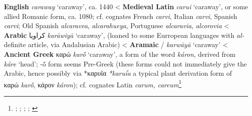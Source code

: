 \begin{etymology}\label{ety:caraway}
\textbf{English} \textit{caraway} `caraway', ca. 1440
< \textbf{Medieval Latin} \textit{carui} `caraway', or some allied Romanic form, ca. 1080; cf. cognates French \textit{carvi}, Italian \textit{carvi}, Spanish \textit{carvi}; Old Spanish \textit{alcaravea}, \textit{alcarahueya}, Portuguese \textit{alcaravia}, \textit{alcorovia}
< \textbf{Arabic} {كراويا} \textit{karāwiyā} `caraway', (loaned to some Eurropean languages with \textit{al-} definite article, via Andalusian Arabic)
< \textbf{Aramaic} {/} \textit{karwāyā} `caraway'
< \textbf{Ancient Greek} {καρώ} \textit{karṓ} `caraway', a form of the word \textit{káron}, derived from \textit{káre} `head'; -ṓ form seems Pre-Greek (these forms could not immediately give the Arabic, hence possibly via *καρυΐα \textit{*karuḯa} a typical plant derivation form of καρώ \textit{karṓ}, κάρον \textit{káron}); cf. cognates Latin \textit{carum, careum}\footnote{\textcite[s.v. caraway]{oed}; \textcite[s.v. caraway]{ahd}; \textcites[74]{corriente_dictionary_2008}[carvi]{tlfi}; \textcites[207]{low_aramaeische_1881}[437-438]{low_flora_1924}; \textcites[653]{beekes_etymological_2010}[599]{sokoloff_dictionary_2002}}
\end{etymology}